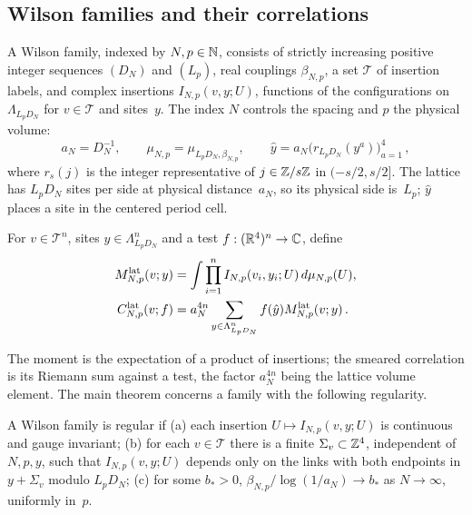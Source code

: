 \subsection{Wilson families and their correlations}\label{sec:continuum}\label{sec:families}

A Wilson family, indexed by $N,p\in\mathbb{N}$, consists of strictly increasing positive integer sequences $(D_N)$ and $(L_p)$, real couplings $\beta_{N,p}$, a set $\mathcal T$ of insertion labels, and complex insertions $I_{N,p}(v,y;U)$, functions of the configurations on $\Lambda_{L_pD_N}$ for $v\in\mathcal T$ and sites~$y$. The index $N$ controls the spacing and $p$ the physical volume:
\begin{equation}\label{eq:I12-physical-placement}
a_N=D_N^{-1},\qquad
\mu_{N,p}=\mu_{L_pD_N,\beta_{N,p}},\qquad
\hat y=a_N\bigl(r_{L_pD_N}(y^a)\bigr)_{a=1}^4\,,
\end{equation}
where $r_s(j)$ is the integer representative of $j\in\mathbb{Z}/s\mathbb{Z}$ in $(-s/2,s/2]$. The lattice has $L_pD_N$ sites per side at physical distance~$a_N$, so its physical side is~$L_p$; $\hat y$ places a site in the centered period cell.

\begin{definition}\label{def:D03}
For $v\in\mathcal T^n$, sites $y\in\Lambda_{L_pD_N}^n$ and a test $f:(\mathbb{R}^4)^n\to\mathbb{C}$, define
\begin{align*}
M^{\mathrm{lat}}_{N,p}(v;y)&=\int\prod_{i=1}^n I_{N,p}(v_i,y_i;U)\,d\mu_{N,p}(U),\\
C^{\mathrm{lat}}_{N,p}(v;f)&=a_N^{4n}\sum_{y\in\Lambda_{L_pD_N}^n}f(\hat y)M^{\mathrm{lat}}_{N,p}(v;y)\,.
\end{align*}
\end{definition}

The moment is the expectation of a product of insertions; the smeared correlation is its Riemann sum against a test, the factor $a_N^{4n}$ being the lattice volume element. The main theorem concerns a family with the following regularity.

\begin{definition}\label{def:Q1}
A Wilson family is regular if
\textup{(a)} each insertion $U\mapsto I_{N,p}(v,y;U)$ is continuous and gauge invariant;
\textup{(b)} for each $v\in\mathcal T$ there is a finite $\Sigma_v\subset\mathbb{Z}^4$, independent of $N,p,y$, such that $I_{N,p}(v,y;U)$ depends only on the links with both endpoints in $y+\Sigma_v$ modulo $L_pD_N$;
\textup{(c)} for some $b_*>0$, $\beta_{N,p}/\log(1/a_N)\to b_*$ as $N\to\infty$, uniformly in~$p$.
\end{definition}

